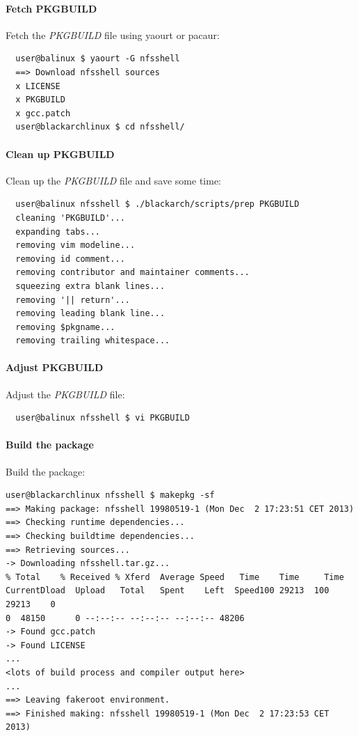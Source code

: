 \documentclass[a4paper, oneside,12pt]{scrartcl}
\begin{document}
\paragraph{Fetch PKGBUILD}
Fetch the \textit{PKGBUILD} file using yaourt or pacaur:
\begin{lstlisting}
  user@balinux $ yaourt -G nfsshell
  ==> Download nfsshell sources
  x LICENSE
  x PKGBUILD
  x gcc.patch
  user@blackarchlinux $ cd nfsshell/
\end{lstlisting}

\paragraph{Clean up PKGBUILD}
Clean up the \textit{PKGBUILD} file and save some time:
\begin{lstlisting}
  user@balinux nfsshell $ ./blackarch/scripts/prep PKGBUILD
  cleaning 'PKGBUILD'...
  expanding tabs...
  removing vim modeline...
  removing id comment...
  removing contributor and maintainer comments...
  squeezing extra blank lines...
  removing '|| return'...
  removing leading blank line...
  removing $pkgname...
  removing trailing whitespace...
\end{lstlisting}

\paragraph{Adjust PKGBUILD}
Adjust the \textit{PKGBUILD} file:
\begin{lstlisting}
  user@balinux nfsshell $ vi PKGBUILD
\end{lstlisting}

\paragraph{Build the package}
Build the package:
\begin{lstlisting}user@blackarchlinux nfsshell $ makepkg -sf
==> Making package: nfsshell 19980519-1 (Mon Dec  2 17:23:51 CET 2013)
==> Checking runtime dependencies...
==> Checking buildtime dependencies...
==> Retrieving sources...
-> Downloading nfsshell.tar.gz...
% Total    % Received % Xferd  Average Speed   Time    Time     Time
CurrentDload  Upload   Total   Spent    Left  Speed100 29213  100 29213    0
0  48150      0 --:--:-- --:--:-- --:--:-- 48206
-> Found gcc.patch
-> Found LICENSE
...
<lots of build process and compiler output here>
...
==> Leaving fakeroot environment.
==> Finished making: nfsshell 19980519-1 (Mon Dec  2 17:23:53 CET 2013)
\end{lstlisting}
\end{document}
